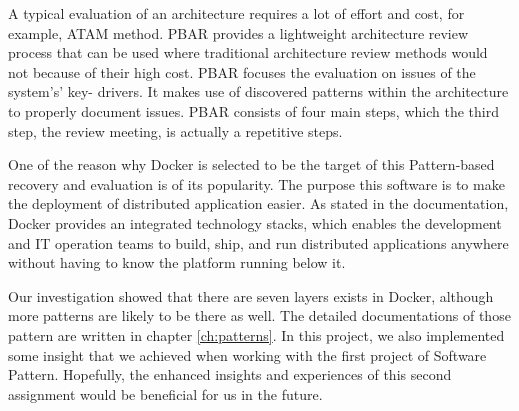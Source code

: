 A typical evaluation of an architecture requires a lot of effort and cost, for
example, ATAM method. PBAR provides a lightweight architecture review process
that can be used where traditional architecture review methods would not because
of their high cost. PBAR focuses the evaluation on issues of the system's' key-
drivers. It makes use of discovered patterns within the architecture to properly
document issues. PBAR consists of four main steps, which the third step, the
review meeting, is actually a repetitive steps.

One of the reason why Docker is selected to be the target of this Pattern-based
recovery and evaluation is of its popularity. The purpose this software is to
make the deployment of distributed application easier. As stated in the
documentation, Docker provides an integrated technology stacks, which enables
the development and IT operation teams to build, ship, and run distributed
applications anywhere without having to know the platform running below it.

Our investigation showed that there are seven layers exists in Docker, although
more patterns are likely to be there as well. The detailed documentations of
those pattern are written in chapter \ref{ch:patterns}. In this project, we also
implemented some insight that we achieved when working with the first project of
Software Pattern. Hopefully, the enhanced insights and experiences of this
second assignment would be beneficial for us in the future.
